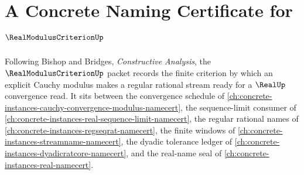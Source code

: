 \chapter{A Concrete Naming Certificate for $\RealModulusCriterionUp$}
\label{ch:concrete-instances-real-modulus-criterion-namecert}

Following Bishop and Bridges, \emph{Constructive Analysis}, the $\RealModulusCriterionUp$ packet records the finite criterion by which an explicit Cauchy modulus makes a regular rational stream ready for a $\RealUp$ convergence read. It sits between the convergence schedule of \autoref{ch:concrete-instances-cauchy-convergence-modulus-namecert}, the sequence-limit consumer of \autoref{ch:concrete-instances-real-sequence-limit-namecert}, the regular rational names of \autoref{ch:concrete-instances-regseqrat-namecert}, the finite windows of \autoref{ch:concrete-instances-streamname-namecert}, the dyadic tolerance ledger of \autoref{ch:concrete-instances-dyadicratcore-namecert}, and the real-name seal of \autoref{ch:concrete-instances-real-namecert}.

